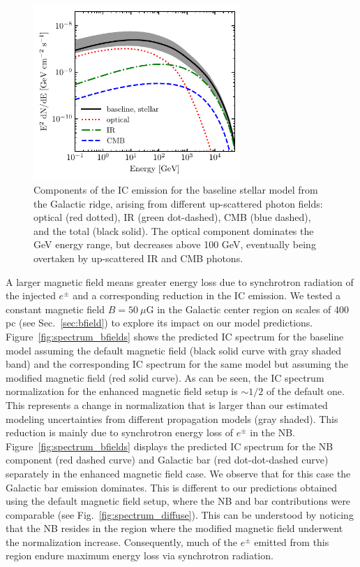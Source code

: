 \documentclass[doublespace,nopageskip]{VTthesis}
\begin{document}
\begin{figure}[htb]
    \centering
    \includegraphics[width=0.7\textwidth]{Figures/IC_MSPs/ics_spectrum_components.pdf}
    \caption{Components of the IC emission for the baseline stellar model from the Galactic ridge, arising from different up-scattered photon fields: optical (red dotted), IR (green dot-dashed), CMB (blue dashed), and the total (black solid). The optical component dominates the GeV energy range, but decreases above 100 GeV, eventually being overtaken by up-scattered IR and CMB photons.}
    \label{fig:spectrum_comp}
\end{figure}

A larger magnetic field means greater energy loss due to synchrotron radiation of the injected $e^\pm$ and a corresponding reduction in the IC emission. We tested a constant magnetic field $B = 50\ \mu$G in the Galactic center region on scales of 400 pc (see Sec.~\ref{sec:bfield}) to explore its impact on our model predictions. Figure~\ref{fig:spectrum_bfields} shows the predicted IC spectrum for the baseline model assuming the default magnetic field (black solid curve with gray shaded band) and the corresponding IC spectrum for the same model but assuming the modified magnetic field (red solid curve). As can be seen, the IC spectrum normalization for the enhanced magnetic field setup is $\sim 1/2$ of the default one. This represents a change in normalization that is larger than our estimated modeling uncertainties from different propagation models (gray shaded). This reduction is mainly due to synchrotron energy loss of $e^\pm$ in the NB. Figure~\ref{fig:spectrum_bfields}  displays the predicted IC spectrum for the NB component (red dashed curve) and Galactic bar (red dot-dot-dashed curve) separately in the enhanced magnetic field case. We observe that for this case the Galactic bar emission dominates. This is different to our predictions obtained using the default magnetic field setup, where the NB and bar  contributions were comparable (see Fig.~\ref{fig:spectrum_diffuse}). This can be understood by noticing that the NB resides in the region where the modified magnetic field underwent the normalization increase. Consequently, much of the $e^\pm$ emitted from this region endure maximum energy loss via synchrotron radiation.
\end{document}
